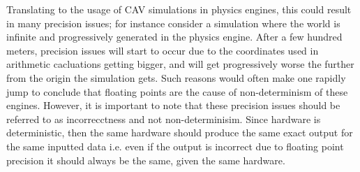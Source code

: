 Translating to the usage of CAV simulations in physics engines, this could result in many precision issues; for instance consider a simulation where the world is infinite and progressively  generated in the physics engine. 
After a few hundred meters, precision issues will start to occur due to the coordinates used in arithmetic cacluations getting bigger, and will get progressively worse the further from the origin the simulation gets. 
Such reasons would often make one rapidly jump to conclude that floating points are the cause of non-determinism of these engines. 
However, it is important to note that these precision issues should be referred to as incorrecctness and not non-determinisim. 
Since hardware is deterministic, then the same hardware should produce the same exact output for the same inputted data i.e. even if the output is incorrect due to floating point precision it should always be the same, given the same hardware.\\\\ 
%
%
%
